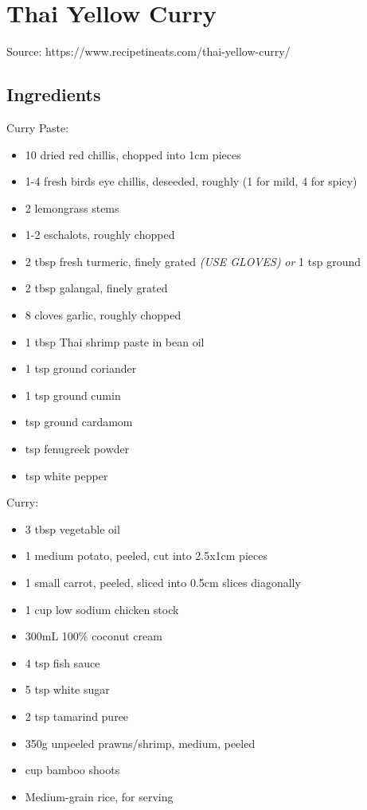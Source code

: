 \clearpage
\section{Thai Yellow Curry}

  
  Source: https://www.recipetineats.com/thai-yellow-curry/
    
  \subsection{Ingredients}
    
  Curry Paste:
  
  \begin{itemize}
    \item 10 dried red chillis, chopped into 1cm pieces
    \item 1-4 fresh birds eye chillis, deseeded, roughly (1 for mild, 4 for spicy)
    \item 2 lemongrass stems
    \item 1-2 eschalots, roughly chopped
    \item 2 tbsp fresh turmeric, finely grated \emph{(USE GLOVES)} \emph{or} 1  tsp ground
    \item 2 tbsp galangal, finely grated
    \item 8 cloves garlic, roughly chopped
    \item 1 tbsp Thai shrimp paste in bean oil
    \item 1 tsp ground coriander
    \item 1 tsp ground cumin
    \item {} tsp ground cardamom
    \item {} tsp fenugreek powder
    \item {} tsp white pepper
  \end{itemize}

  Curry:

  \begin{itemize}
    \item 3 tbsp vegetable oil
    \item 1 medium potato, peeled, cut into 2.5x1cm pieces
    \item 1 small carrot, peeled, sliced into 0.5cm slices diagonally
    \item 1 cup low sodium chicken stock
    \item 300mL 100\% coconut cream
    \item 4 tsp fish sauce
    \item 5 tsp white sugar
    \item 2 tsp tamarind puree
    \item 350g unpeeled prawns/shrimp, medium, peeled
    \item {} cup bamboo shoots
    \item Medium-grain rice, for serving
  \end{itemize}


